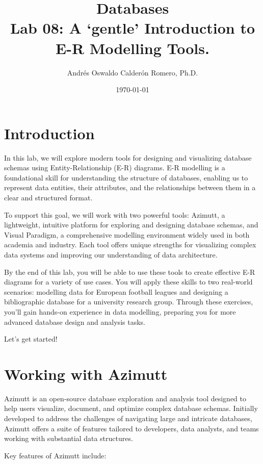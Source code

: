 \documentclass{article}
\title{Databases \\ Lab 08: A `gentle' Introduction to E-R Modelling Tools.}
\author{Andrés Oswaldo Calderón Romero, Ph.D.}
\date{\today}
\begin{document}
\maketitle

\section{Introduction}
In this lab, we will explore modern tools for designing and visualizing database schemas using Entity-Relationship (E-R) diagrams. E-R modelling is a foundational skill for understanding the structure of databases, enabling us to represent data entities, their attributes, and the relationships between them in a clear and structured format.

To support this goal, we will work with two powerful tools: Azimutt, a lightweight, intuitive platform for exploring and designing database schemas, and Visual Paradigm, a comprehensive modelling environment widely used in both academia and industry. Each tool offers unique strengths for visualizing complex data systems and improving our understanding of data architecture.

By the end of this lab, you will be able to use these tools to create effective E-R diagrams for a variety of use cases. You will apply these skills to two real-world scenarios: modelling data for European football leagues and designing a bibliographic database for a university research group. Through these exercises, you'll gain hands-on experience in data modelling, preparing you for more advanced database design and analysis tasks.

Let’s get started!

\section{Working with Azimutt} \label{sec:azimutt}
Azimutt is an open-source database exploration and analysis tool designed to help users visualize, document, and optimize complex database schemas. Initially developed to address the challenges of navigating large and intricate databases, Azimutt offers a suite of features tailored to developers, data analysts, and teams working with substantial data structures.

Key features of Azimutt include:
\end{document}
